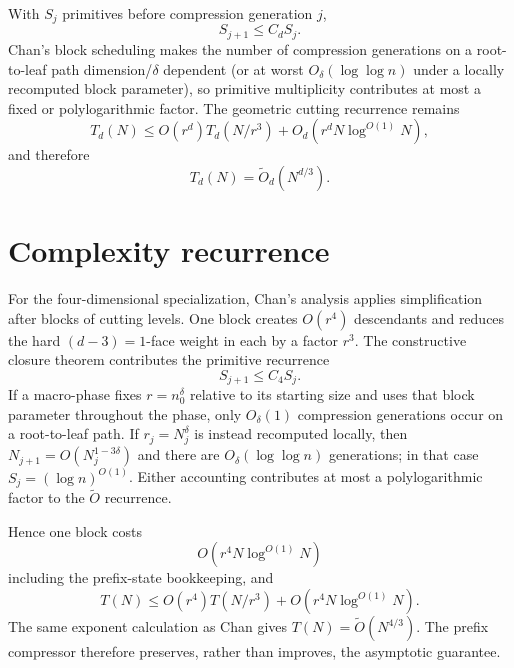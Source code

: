 \documentclass[12pt,a4paper]{article}
\theoremstyle{definition}
\newcommand{\1}{\mathbf 1}
\begin{document}
With $S_j$ primitives before compression generation $j$,
\[
S_{j+1}\le C_dS_j.
\]
Chan's block scheduling makes the number of compression generations on a root-to-leaf path dimension/$\delta$ dependent (or at worst $O_\delta(\log\log n)$ under a locally recomputed block parameter), so primitive multiplicity contributes at most a fixed or polylogarithmic factor.  The geometric cutting recurrence remains
\[
T_d(N)\le O(r^d)T_d(N/r^3)+O_d(r^dN\log^{O(1)}N),
\]
and therefore
\[
T_d(N)=\widetilde O_d(N^{d/3}).
\]


\section{Complexity recurrence}                                   \label{app:recurrence}

For the four-dimensional specialization, Chan's analysis applies simplification after blocks of cutting levels.  One block creates $O(r^4)$ descendants and reduces the hard $(d-3)=1$-face weight in each by a factor $r^3$.  The constructive closure theorem contributes the primitive recurrence
\[
S_{j+1}\le C_4S_j.
\]
If a macro-phase fixes $r=n_0^{\delta}$ relative to its starting size and uses that block parameter throughout the phase, only $O_{\delta}(1)$ compression generations occur on a root-to-leaf path.  If $r_j=N_j^{\delta}$ is instead recomputed locally, then $N_{j+1}=O(N_j^{1-3\delta})$ and there are $O_{\delta}(\log\log n)$ generations; in that case $S_j=(\log n)^{O(1)}$.  Either accounting contributes at most a polylogarithmic factor to the $\widetilde O$ recurrence.

Hence one block costs
\[
O(r^4N\log^{O(1)}N)
\]
including the prefix-state bookkeeping, and
\[
T(N)\le O(r^4)T(N/r^3)+O(r^4N\log^{O(1)}N).
\]
The same exponent calculation as Chan gives $T(N)=\widetilde O(N^{4/3})$.  The prefix compressor therefore preserves, rather than improves, the asymptotic guarantee.
\end{document}
